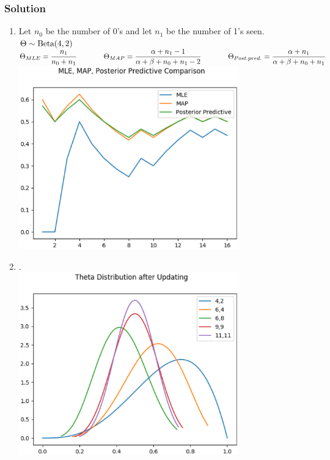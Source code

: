 \documentclass[submit]{harvardml}
\begin{document}
\subsubsection*{Solution}
\begin{enumerate}
\item Let $n_0$ be the number of 0's and let $n_1$ be the number of 1's seen. $\Theta \sim \textup{Beta}(4,2)$\\
$\Theta_{MLE} = \dfrac{n_1}{n_0 + n_1} \hspace{0.5 in} \Theta_{MAP} = \dfrac{\alpha + n_1 - 1}{\alpha + \beta + n_0 + n_1 - 2} \hspace{0.5 in} \Theta_{Post. pred.} = \dfrac{\alpha + n_1}{\alpha + \beta + n_0 + n_1}$ \\
\includegraphics[width=0.75\textwidth]{MLE_MAP_Posterior_Predictive_Comparison.eps}

\item . \\ \includegraphics[width = 0.75\textwidth]{Theta_Distribution_after_Updating.eps}


\end{enumerate}
\end{document}
